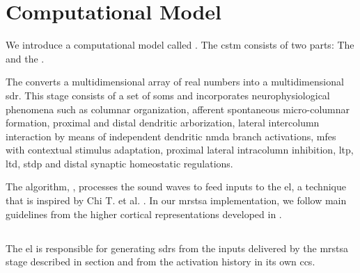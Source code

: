 \documentclass[10pt,letterpaper]{article}
\begin{document}
\section*{Computational Model}

We introduce a computational model called \textbf{}. The \gls{cstm} consists of two parts: The  and the . 

The  converts a multidimensional array of real numbers into a multidimensional \gls{sdr}.
This stage 
consists of
a set of \glspl{som} \cite{kohonen_2082, Kohonen:1989:SAM:69371}
and incorporates neurophysiological phenomena such as columnar organization, afferent spontaneous
micro-columnar formation, proximal and distal dendritic arborization, lateral intercolumn interaction by means of independent dendritic \gls{nmda} branch activations, \glspl{mfe} with contextual stimulus adaptation, proximal lateral intracolumn inhibition, \gls{ltp}, \gls{ltd}, \gls{stdp} and distal synaptic homeostatic regulations.


The algorithm, , processes the sound waves to feed inputs to the \gls{el}, a technique that is inspired by Chi T. et al. \cite{chi_2005}.
In our \gls{mrstsa} implementation, we follow main guidelines from the higher cortical representations
developed in \cite{chi_2005}.



\subsection*{}

The \gls{el} is responsible for generating \glspl{sdr} from the inputs delivered by the \gls{mrstsa} stage
described in section  and from the activation history in its own \glspl{cc}.
\end{document}
